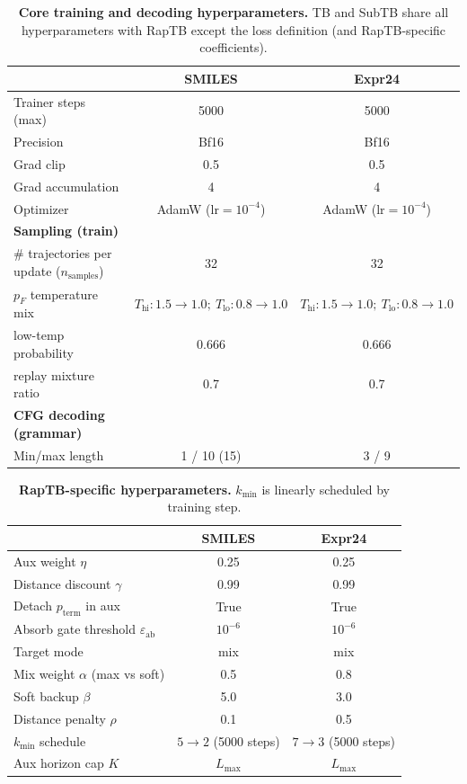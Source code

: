 \documentclass{article}
\theoremstyle{plain}
\theoremstyle{definition}
\theoremstyle{remark}
\begin{document}
\begin{table}[!htbp]
\centering
\small
\setlength{\tabcolsep}{5pt}
\renewcommand{\arraystretch}{1.10}
\caption{\textbf{Core training and decoding hyperparameters.}
TB and SubTB share all hyperparameters with RapTB except the loss definition (and RapTB-specific coefficients).
}
\label{tab:repro_core_hparams}
\begin{tabular}{lcc}
\toprule
 & \textbf{SMILES} & \textbf{Expr24} \\
\midrule
Trainer steps (max) & 5000 & 5000 \\
Precision & Bf16 & Bf16 \\
Grad clip & 0.5 & 0.5 \\
Grad accumulation & 4 & 4 \\
Optimizer & AdamW ($\mathrm{lr}=10^{-4}$) & AdamW ($\mathrm{lr}=10^{-4}$) \\
\midrule
\textbf{Sampling (train)} &  &  \\
\quad \# trajectories per update ($n_{\mathrm{samples}}$) & 32 & 32 \\
\quad $p_F$ temperature mix & $T_{\mathrm{hi}}:1.5\to 1.0;\ T_{\mathrm{lo}}:0.8\to 1.0$ & $T_{\mathrm{hi}}:1.5\to 1.0;\ T_{\mathrm{lo}}:0.8\to 1.0$ \\
\quad low-temp probability & 0.666 & 0.666 \\
\quad replay mixture ratio & 0.7 & 0.7 \\
\midrule
\textbf{CFG decoding (grammar)} &  &  \\
Min/max length & 1 / 10 (15) & 3 / 9 \\
\bottomrule
\end{tabular}
\end{table}

\begin{table}[!htbp]
\centering
\small
\setlength{\tabcolsep}{4.5pt}
\renewcommand{\arraystretch}{1.10}
\caption{\textbf{RapTB-specific hyperparameters.} $k_{\min}$ is linearly scheduled by training step.}
\label{tab:repro_raptb_hparams}
\begin{tabular}{lcc}
\toprule
 & \textbf{SMILES} & \textbf{Expr24} \\
\midrule
Aux weight $\eta$ & 0.25 & 0.25 \\
Distance discount $\gamma$ & 0.99 & 0.99 \\
Detach $p_{\mathrm{term}}$ in aux & True & True \\
Absorb gate threshold $\varepsilon_{\mathrm{ab}}$ & $10^{-6}$ & $10^{-6}$ \\
Target mode & mix & mix \\
Mix weight $\alpha$ (max vs soft) & 0.5 & 0.8 \\
Soft backup $\beta$ & 5.0 & 3.0 \\
Distance penalty $\rho$ & 0.1 & 0.5 \\
$k_{\min}$ schedule & $5\to 2$ (5000 steps) & $7\to 3$ (5000 steps) \\
Aux horizon cap $K$ & $L_{\max}$ & $L_{\max}$ \\
\bottomrule
\end{tabular}
\end{table}
\end{document}
